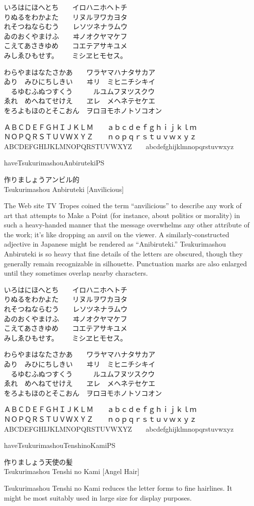 \documentclass[14pt]{extarticle}
\newcommand{\iroha}{%
いろはにほへとち~~~~イロハニホヘトチ\\
りぬるをわかよた~~~~リヌルヲワカヨタ\\
れそつねならむう~~~~レソツネナラムウ\\
ゐのおくやまけふ~~~~ヰノオクヤマケフ\\
こえてあさきゆめ~~~~コエテアサキユメ\\
みしゑひもせす。~~~~ミシヱヒモセス。\par
}
\newcommand{\gojuuonzu}{%
わらやまはなたさかあ~~~~ワラヤマハナタサカア\\
ゐり~~みひにちしきい~~~~ヰリ~~ミヒニチシキイ\\
~~るゆむふぬつすくう~~~~~~ルユムフヌツスクウ\\
ゑれ~~めへねてせけえ~~~~ヱレ~~メヘネテセケエ\\
をろよもほのとそこおん~~ヲロヨモホノトソコオン\par
}
\begin{document}
\marumono
\iroha
\gojuuonzu

ＡＢＣＤＥＦＧＨＩＪＫＬＭ~~~~ａｂｃｄｅｆｇｈｉｊｋｌｍ\\
ＮＯＰＱＲＳＴＵＶＷＸＹＺ~~~~ｎｏｐｑｒｓｔｕｖｗｘｙｚ\\
ABCDEFGHIJKLMNOPQRSTUVWXYZ~~~~abcdefghijklmnopqrstuvwxyz

\clearpage


\expandafter\ifx\csname haveTsukurimashouAnbirutekiPS\endcsname\relax\else

\anbiruteki

\Large
作りましょうアンビル的\\
Tsukurimashou Anbiruteki [Anvilicious]

\normalsize

The Web site TV Tropes coined the term ``anvilicious'' to describe any work
of art that attempts to Make a Point (for instance, about politics or
morality) in such a heavy-handed manner that the message overwhelms any
other attribute of the work; it's like dropping an anvil on the viewer.  A
similarly-constructed adjective in Japanese might be rendered as
``Anibiruteki.'' Tsukurimashou Anbiruteki is so heavy that fine details of
the letters are obscured, though they generally remain recognizable in
silhouette.  Punctuation marks are also enlarged until they sometimes
overlap nearby characters.

\anbirutekimono
\iroha
\gojuuonzu

ＡＢＣＤＥＦＧＨＩＪＫＬＭ~~~~ａｂｃｄｅｆｇｈｉｊｋｌｍ\\
ＮＯＰＱＲＳＴＵＶＷＸＹＺ~~~~ｎｏｐｑｒｓｔｕｖｗｘｙｚ\\
ABCDEFGHIJKLMNOPQRSTUVWXYZ~~~~abcdefghijklmnopqrstuvwxyz

\clearpage

\fi


\expandafter\ifx\csname haveTsukurimashouTenshinoKamiPS\endcsname\relax\else

\tenshinokami

\Large
作りましょう天使の髪\\
Tsukurimashou Tenshi no Kami [Angel Hair]

\normalsize

Tsukurimashou Tenshi no Kami reduces the letter forms to fine hairlines.  It
might be most suitably used in large size for display purposes.
\end{document}
